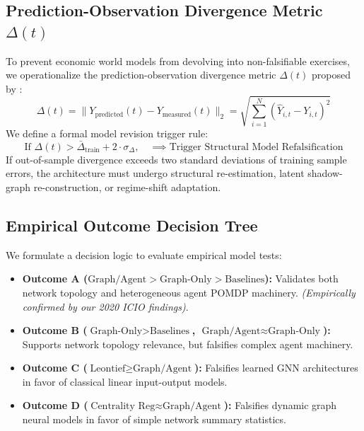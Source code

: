 \documentclass[11pt,a4paper]{article}
\begin{document}
\subsection{\texorpdfstring{Prediction-Observation Divergence Metric $\Delta(t)$}{Prediction-Observation Divergence Metric Delta(t)}}

To prevent economic world models from devolving into non-falsifiable exercises, we operationalize the prediction-observation divergence metric $\Delta(t)$ proposed by \citet{worldmodel2026graph}:
\begin{equation}
    \Delta(t) = \| Y_{\text{predicted}}(t) - Y_{\text{measured}}(t) \|_2 = \sqrt{\sum_{i=1}^N \left( \hat{Y}_{i,t} - Y_{i,t} \right)^2}
    \label{eq:divergence}
\end{equation}
We define a formal model revision trigger rule:
\begin{equation}
    \text{If } \Delta(t) > \bar{\Delta}_{\text{train}} + 2 \cdot \sigma_{\Delta}, \quad \implies \text{Trigger Structural Model Refalsification}
\end{equation}
If out-of-sample divergence exceeds two standard deviations of training sample errors, the architecture must undergo structural re-estimation, latent shadow-graph re-construction, or regime-shift adaptation.

\subsection{Empirical Outcome Decision Tree}

We formulate a decision logic to evaluate empirical model tests:
\begin{itemize}
    \item \textbf{Outcome A ($\text{Graph/Agent} > \text{Graph-Only} > \text{Baselines}$):} Validates both network topology and heterogeneous agent POMDP machinery. \textit{(Empirically confirmed by our 2020 ICIO findings)}.
    \item \textbf{Outcome B ($\text{Graph-Only} > \text{Baselines}$, $\text{Graph/Agent} \approx \text{Graph-Only}$):} Supports network topology relevance, but falsifies complex agent machinery.
    \item \textbf{Outcome C ($\text{Leontief} \geq \text{Graph/Agent}$):} Falsifies learned GNN architectures in favor of classical linear input-output models.
    \item \textbf{Outcome D ($\text{Centrality Reg} \approx \text{Graph/Agent}$):} Falsifies dynamic graph neural models in favor of simple network summary statistics.
\end{itemize}
\end{document}
